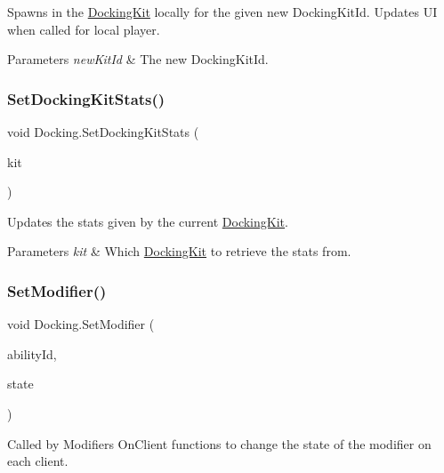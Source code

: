 Spawns in the \hyperlink{class_docking_kit}{Docking\+Kit} locally for the given new Docking\+Kit\+Id. Updates UI when called for local player. 


\begin{DoxyParams}{Parameters}
{\em new\+Kit\+Id} & The new Docking\+Kit\+Id.\\
\hline
\end{DoxyParams}
\hypertarget{class_docking_ae17ab0c0fc119ad63467036d90c9369b}{}\label{class_docking_ae17ab0c0fc119ad63467036d90c9369b} 
\subsubsection{\texorpdfstring{Set\+Docking\+Kit\+Stats()}{SetDockingKitStats()}}
{\footnotesize\ttfamily void Docking.\+Set\+Docking\+Kit\+Stats (\begin{DoxyParamCaption}\item[{\hyperlink{class_docking_kit}{Docking\+Kit}}]{kit }\end{DoxyParamCaption})}



Updates the stats given by the current \hyperlink{class_docking_kit}{Docking\+Kit}. 


\begin{DoxyParams}{Parameters}
{\em kit} & Which \hyperlink{class_docking_kit}{Docking\+Kit} to retrieve the stats from.\\
\hline
\end{DoxyParams}
\hypertarget{class_docking_ad9f7c2688aca9e6b91c6b07082041eb4}{}\label{class_docking_ad9f7c2688aca9e6b91c6b07082041eb4} 
\subsubsection{\texorpdfstring{Set\+Modifier()}{SetModifier()}}
{\footnotesize\ttfamily void Docking.\+Set\+Modifier (\begin{DoxyParamCaption}\item[{int}]{ability\+Id,  }\item[{bool}]{state }\end{DoxyParamCaption})}



Called by Modifiers On\+Client functions to change the state of the modifier on each client. 


